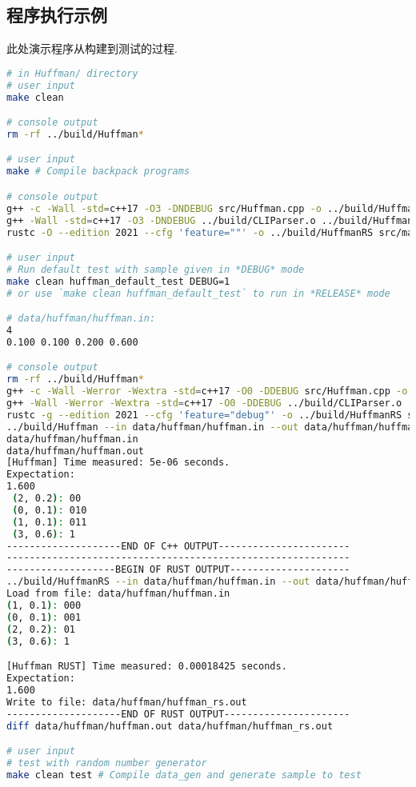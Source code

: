 \subsection{程序执行示例}
\label{sec:dpBench}
此处演示程序从构建到测试的过程.
\begin{lstlisting}[language=bash]
# in Huffman/ directory
# user input
make clean

# console output
rm -rf ../build/Huffman*

# user input
make # Compile backpack programs

# console output
g++ -c -Wall -std=c++17 -O3 -DNDEBUG src/Huffman.cpp -o ../build/Huffman.o
g++ -Wall -std=c++17 -O3 -DNDEBUG ../build/CLIParser.o ../build/Huffman.o -o ../build/Huffman
rustc -O --edition 2021 --cfg 'feature=""' -o ../build/HuffmanRS src/main.rs

# user input
# Run default test with sample given in *DEBUG* mode
make clean huffman_default_test DEBUG=1
# or use `make clean huffman_default_test` to run in *RELEASE* mode

# data/huffman/huffman.in:
4
0.100 0.100 0.200 0.600

# console output
rm -rf ../build/Huffman*
g++ -c -Wall -Werror -Wextra -std=c++17 -O0 -DDEBUG src/Huffman.cpp -o ../build/Huffman.o
g++ -Wall -Werror -Wextra -std=c++17 -O0 -DDEBUG ../build/CLIParser.o ../build/Huffman.o -o ../build/Huffman
rustc -g --edition 2021 --cfg 'feature="debug"' -o ../build/HuffmanRS src/main.rs
../build/Huffman --in data/huffman/huffman.in --out data/huffman/huffman.out
data/huffman/huffman.in
data/huffman/huffman.out
[Huffman] Time measured: 5e-06 seconds.
Expectation:
1.600
 (2, 0.2): 00
 (0, 0.1): 010
 (1, 0.1): 011
 (3, 0.6): 1
--------------------END OF C++ OUTPUT-----------------------
------------------------------------------------------------
-------------------BEGIN OF RUST OUTPUT---------------------
../build/HuffmanRS --in data/huffman/huffman.in --out data/huffman/huffman_rs.out
Load from file: data/huffman/huffman.in
(1, 0.1): 000
(0, 0.1): 001
(2, 0.2): 01
(3, 0.6): 1

[Huffman RUST] Time measured: 0.00018425 seconds.
Expectation:
1.600
Write to file: data/huffman/huffman_rs.out
--------------------END OF RUST OUTPUT----------------------
diff data/huffman/huffman.out data/huffman/huffman_rs.out

# user input
# test with random number generator
make clean test # Compile data_gen and generate sample to test


\end{lstlisting}
